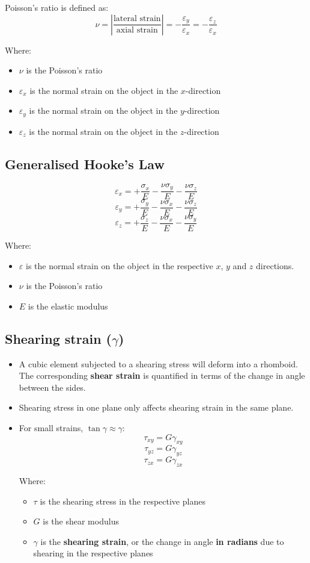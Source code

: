 \documentclass[11pt]{article}
\begin{document}
Poisson's ratio is defined as:
\[\nu = \left| \frac{\text{lateral strain}}{\text{axial strain}} \right| = - \frac{\varepsilon_y}{\varepsilon_x} = - \frac{\varepsilon_z}{\varepsilon_x}\]

Where:
\begin{itemize}
\item \(\nu\) is the Poisson's ratio
\item \(\varepsilon_x\) is the normal strain on the object in the \(x\)-direction
\item \(\varepsilon_y\) is the normal strain on the object in the \(y\)-direction
\item \(\varepsilon_z\) is the normal strain on the object in the \(z\)-direction
\end{itemize}
\subsection{Generalised Hooke's Law}
\label{sec:org0c22bcd}
\[\varepsilon_x = + \frac{\sigma_x}{E} - \frac{\nu \sigma_y}{E} - \frac{\nu \sigma_z}{E}\]
\[\varepsilon_y = + \frac{\sigma_y}{E} - \frac{\nu \sigma_x}{E} - \frac{\nu \sigma_z}{E}\]
\[\varepsilon_z = + \frac{\sigma_z}{E} - \frac{\nu \sigma_x}{E} - \frac{\nu \sigma_y}{E}\]

Where:
\begin{itemize}
\item \(\varepsilon\) is the normal strain on the object in the respective \(x\), \(y\) and \(z\) directions.
\item \(\nu\) is the Poisson's ratio
\item \(E\) is the elastic modulus
\end{itemize}
\subsection{Shearing strain (\(\gamma\))}
\label{sec:orgb3dcc65}
\begin{itemize}
\item A cubic element subjected to a shearing stress will deform into a rhomboid. The corresponding \textbf{shear strain} is quantified in terms of the change in angle between the sides.
\item Shearing stress in one plane only affects shearing strain in the same plane.
\item For small strains, \(\tan \gamma \approx \gamma\):
\[\tau_{xy} = G \gamma_{xy}\]
\[\tau_{yz} = G \gamma_{yz}\]
\[\tau_{zx} = G \gamma_{zx}\]

Where:
\begin{itemize}
\item \(\tau\) is the shearing stress in the respective planes
\item \(G\) is the shear modulus
\item \(\gamma\) is the \textbf{shearing strain}, or the change in angle \textbf{in radians} due to shearing in the respective planes
\end{itemize}
\end{itemize}
\end{document}
